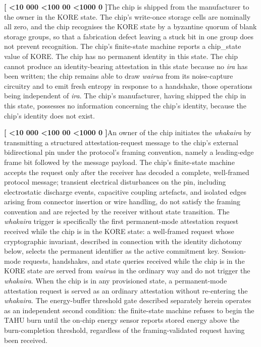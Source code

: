 \documentclass[12pt,letterpaper]{article}
\newcounter{para}
\newcommand{\padzero}{%
  \ifnum\value{para}<10 000\else%
  \ifnum\value{para}<100 00\else%
  \ifnum\value{para}<1000 0\else%
  \fi\fi\fi}
\newcommand{\para}{%
  \refstepcounter{para}\noindent\textbf{[\padzero\arabic{para}]}\hspace{0.5em}\ignorespaces}
\begin{document}
\para The chip is shipped from the manufacturer to the owner in the KORE state. The chip's write-once storage cells are nominally all zero, and the chip recognises the KORE state by a byzantine quorum of blank storage groups, so that a fabrication defect leaving a stuck bit in one group does not prevent recognition. The chip's finite-state machine reports a chip\_state value of KORE. The chip has no permanent identity in this state. The chip cannot produce an identity-bearing attestation in this state because no \emph{ira} has been written; the chip remains able to draw \emph{wairua} from its noise-capture circuitry and to emit fresh entropy in response to a handshake, those operations being independent of \emph{ira}. The chip's manufacturer, having shipped the chip in this state, possesses no information concerning the chip's identity, because the chip's identity does not exist.

\para An owner of the chip initiates the \emph{whakaira} by transmitting a structured attestation-request message to the chip's external bidirectional pin under the protocol's framing convention, namely a leading-edge frame bit followed by the message payload. The chip's finite-state machine accepts the request only after the receiver has decoded a complete, well-framed protocol message; transient electrical disturbances on the pin, including electrostatic discharge events, capacitive coupling artefacts, and isolated edges arising from connector insertion or wire handling, do not satisfy the framing convention and are rejected by the receiver without state transition. The \emph{whakaira} trigger is specifically the first permanent-mode attestation request received while the chip is in the KORE state: a well-framed request whose cryptographic invariant, described in connection with the identity dichotomy below, selects the permanent identifier as the active commitment key. Session-mode requests, handshakes, and state queries received while the chip is in the KORE state are served from \emph{wairua} in the ordinary way and do not trigger the \emph{whakaira}. When the chip is in any provisioned state, a permanent-mode attestation request is served as an ordinary attestation without re-entering the \emph{whakaira}. The energy-buffer threshold gate described separately herein operates as an independent second condition: the finite-state machine refuses to begin the TAHU burn until the on-chip energy sensor reports stored energy above the burn-completion threshold, regardless of the framing-validated request having been received.
\end{document}
